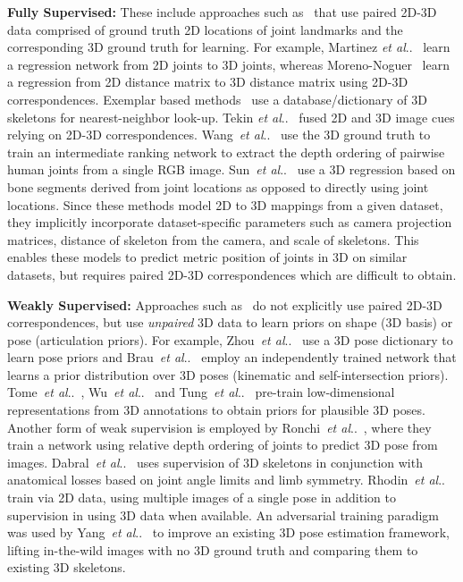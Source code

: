 \documentclass[10pt,twocolumn,letterpaper]{article}
\makeatletter
\DeclareRobustCommand\onedot{\futurelet\@let@token\@onedot}
\def\@onedot{\ifx\@let@token.\else.\null\fi\xspace}
\def\etal{\emph{et al}\onedot}
\makeatother
\begin{document}
\textbf{Fully Supervised:} These include approaches such as~\cite{Li_2015_ICCV,MartinezICCV2017,Nie_2017_ICCV} that use paired 2D-3D data comprised of ground truth 2D locations of joint landmarks and the corresponding 3D ground truth for learning. For example, Martinez \etal~\cite{MartinezICCV2017} learn a regression network from 2D joints to 3D joints, whereas Moreno-Noguer~\cite{Moreno-Noguer_2017_CVPR} learn a regression from 2D distance matrix to 3D distance matrix using 2D-3D correspondences. Exemplar based methods~\cite{ChenDeva2017,jiang20103d,Yasin_2016_CVPR} use a database/dictionary of 3D skeletons for nearest-neighbor look-up.
Tekin \etal~\cite{Tekin_2017_ICCV} fused 2D and 3D image cues relying on 2D-3D correspondences. Wang~\etal~\cite{DRPose3D} use the 3D ground truth to train an intermediate ranking network to extract the depth ordering of pairwise human joints from a single RGB image. Sun~\etal~\cite{sun2017compositional} use a 3D regression based on bone segments derived from joint locations as opposed to directly using joint locations.
Since these methods model 2D to 3D mappings from a given dataset, they implicitly incorporate dataset-specific parameters such as camera projection matrices, distance of skeleton from the camera, and scale of skeletons. This enables these models to predict metric position of joints {in 3D} on similar datasets, but requires paired 2D-3D correspondences which are difficult to obtain.


\textbf{Weakly Supervised:} Approaches such as~\cite{Brau3DV2016,AAAI18_yxu_3dpose,Tome_2017_CVPR,zhou2017towards,Zhou_2016_CVPR,MonoCap} do not explicitly use paired 2D-3D correspondences, but use \textit{unpaired} 3D data to learn priors on shape (3D basis) or pose (articulation priors). For example, Zhou~\etal~\cite{Zhou_2016_CVPR} use a 3D pose dictionary to learn pose priors and Brau~\etal~\cite{Brau3DV2016} employ an independently trained network that learns a prior distribution over 3D poses (kinematic and self-intersection priors). Tome~\etal~\cite{Tome_2017_CVPR}, Wu~\etal~\cite{InterpreterNetwork2016} and Tung~\etal~\cite{Tung_2017_ICCV} pre-train low-dimensional representations from 3D annotations to obtain priors for plausible 3D poses. Another form of weak supervision is employed by Ronchi~\etal~\cite{relativeposeBMVC18}, where they train a network using relative depth ordering of joints to predict 3D pose from images. Dabral~\etal~\cite{dabral2018learning} uses supervision of 3D skeletons in conjunction with anatomical losses based on joint angle limits and limb symmetry. Rhodin~\etal~\cite{rhodin2018learning} train via 2D data, using multiple images of a single pose in addition to supervision in using 3D data when available. An adversarial training paradigm was used by Yang~\etal~\cite{Yang_2018_CVPR} to improve an existing 3D pose estimation framework, lifting in-the-wild images with no 3D ground truth and comparing them to existing 3D skeletons. 
\end{document}
